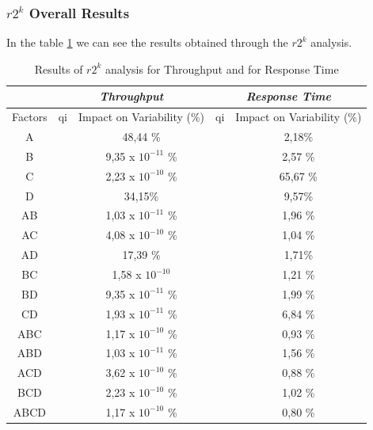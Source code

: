 \subsubsection{$r2^k$ Overall Results}
In the table \ref{tab: 2kr_results} we can see the results obtained through the $r2^k$ analysis.
\begin{table}[H]
	\centering
	\begin{tabular}{|c|c|c|c|c|}
		\hline
		\textbf{} & \multicolumn{2}{c|}{\textit{\textbf{Throughput}}} & \multicolumn{2}{c|}{\textit{\textbf{Response Time}}} \\ \hline
		Factors   & qi          & Impact on Variability (\%)          & qi            & Impact on Variability (\%)           \\ \hline
		A    &  & 48,44 \%    & \textbf{} & 2,18\%  \\ \hline
		B    &  & 9,35 x $10^{-11}$ \% & \textbf{} & 2,57 \%  \\ \hline
		C    &  & 2,23 x $10^{-10}$ \% & \textbf{} & 65,67 \% \\ \hline
		D    &  & 34,15\%    & \textbf{} & 9,57\%  \\ \hline
		AB   &  & 1,03 x $10^{-11}$ \% & \textbf{} & 1,96 \%  \\ \hline
		AC   &  & 4,08 x $10^{-10}$ \% & \textbf{} & 1,04 \%  \\ \hline
		AD   &  & 17,39 \%    & \textbf{} & 1,71\%  \\ \hline
		BC   &  & 1,58 x $10^{-10}$ & \textbf{} & 1,21 \%  \\ \hline
		BD   &  & 9,35 x $10^{-11}$ \% & \textbf{} & 1,99 \%  \\ \hline
		CD   &  & 1,93 x $10^{-11}$ \% & \textbf{} & 6,84 \%  \\ \hline
		ABC  &  & 1,17 x $10^{-10}$ \% & \textbf{} & 0,93 \%  \\ \hline
		ABD  &  & 1,03 x $10^{-11}$ \% & \textbf{} & 1,56 \%  \\ \hline
		ACD  &  & 3,62 x $10^{-10}$ \% & \textbf{} & 0,88 \%  \\ \hline
		BCD  &  & 2,23 x $10^{-10}$ \% & \textbf{} & 1,02 \%  \\ \hline
		ABCD &  & 1,17 x $10^{-10}$ \% & \textbf{} & 0,80 \%  \\ \hline
	\end{tabular}
	\caption{Results of $r2^k$ analysis for Throughput and for Response Time}
	\label{tab: 2kr_results}
\end{table}
																

